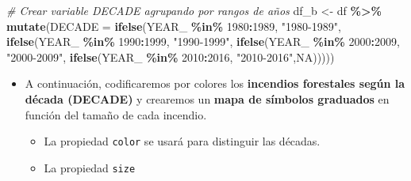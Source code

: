 \documentclass[
]{book}
\newenvironment{Shaded}{\begin{snugshade}}{\end{snugshade}}
\newcommand{\AttributeTok}[1]{\textcolor[rgb]{0.13,0.29,0.53}{#1}}
\newcommand{\CommentTok}[1]{\textcolor[rgb]{0.56,0.35,0.01}{\textit{#1}}}
\newcommand{\ConstantTok}[1]{\textcolor[rgb]{0.56,0.35,0.01}{#1}}
\newcommand{\DecValTok}[1]{\textcolor[rgb]{0.00,0.00,0.81}{#1}}
\newcommand{\FunctionTok}[1]{\textcolor[rgb]{0.13,0.29,0.53}{\textbf{#1}}}
\newcommand{\NormalTok}[1]{#1}
\newcommand{\OtherTok}[1]{\textcolor[rgb]{0.56,0.35,0.01}{#1}}
\newcommand{\SpecialCharTok}[1]{\textcolor[rgb]{0.81,0.36,0.00}{\textbf{#1}}}
\newcommand{\StringTok}[1]{\textcolor[rgb]{0.31,0.60,0.02}{#1}}
\providecommand{\tightlist}{%
  \setlength{\itemsep}{0pt}\setlength{\parskip}{0pt}}
\begin{document}
\begin{Shaded}
\begin{Highlighting}[]
\CommentTok{\# Crear variable DECADE agrupando por rangos de años}
\NormalTok{df\_b }\OtherTok{\textless{}{-}}\NormalTok{ df }\SpecialCharTok{\%\textgreater{}\%} 
  \FunctionTok{mutate}\NormalTok{(}\AttributeTok{DECADE =} \FunctionTok{ifelse}\NormalTok{(YEAR\_ }\SpecialCharTok{\%in\%} \DecValTok{1980}\SpecialCharTok{:}\DecValTok{1989}\NormalTok{, }\StringTok{"1980{-}1989"}\NormalTok{,}
                         \FunctionTok{ifelse}\NormalTok{(YEAR\_ }\SpecialCharTok{\%in\%} \DecValTok{1990}\SpecialCharTok{:}\DecValTok{1999}\NormalTok{, }\StringTok{"1990{-}1999"}\NormalTok{,}
                         \FunctionTok{ifelse}\NormalTok{(YEAR\_ }\SpecialCharTok{\%in\%} \DecValTok{2000}\SpecialCharTok{:}\DecValTok{2009}\NormalTok{, }\StringTok{"2000{-}2009"}\NormalTok{,}
                         \FunctionTok{ifelse}\NormalTok{(YEAR\_ }\SpecialCharTok{\%in\%} \DecValTok{2010}\SpecialCharTok{:}\DecValTok{2016}\NormalTok{, }\StringTok{"2010{-}2016"}\NormalTok{,}\ConstantTok{NA}\NormalTok{)))))}
\end{Highlighting}
\end{Shaded}

\begin{itemize}
\tightlist
\item
  A continuación, codificaremos por colores los \textbf{incendios forestales según la década (DECADE)} y crearemos un \textbf{mapa de símbolos graduados} en función del tamaño de cada incendio.

  \begin{itemize}
  \tightlist
  \item
    La propiedad \texttt{color} se usará para distinguir las décadas.\\
  \item
    La propiedad \texttt{size}
  \end{itemize}
\end{itemize}
\end{document}
